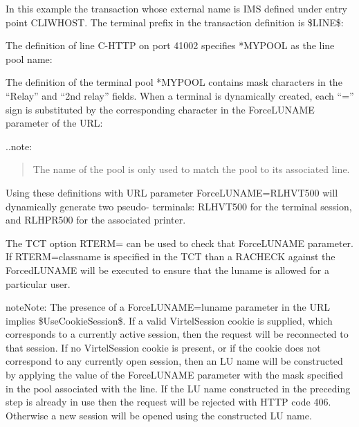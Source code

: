 \documentclass[letterpaper,10pt,english]{sphinxmanual}
\begin{document}
In this example the transaction whose external name is IMS defined under entry point CLIWHOST. The terminal prefix in the transaction definition is \$LINE\$:


The definition of line C-HTTP on port 41002 specifies *MYPOOL as the line pool name:


The definition of the terminal pool *MYPOOL contains mask characters in the “Relay” and “2nd relay” fields. When a terminal is dynamically created, each “=” sign is substituted by the corresponding character in the ForceLUNAME parameter of the URL:


..note:
\begin{quote}

The name of the pool is only used to match the pool to its associated line.
\end{quote}

Using these definitions with URL parameter ForceLUNAME=RLHVT500 will dynamically generate two pseudo- terminals: RLHVT500 for the terminal session, and RLHPR500 for the associated printer.

The TCT option RTERM= can be used to check that ForceLUNAME parameter. If RTERM=classname is specified in the TCT than a RACHECK against the ForcedLUNAME will be executed to ensure that the luname is allowed for a particular user.

\begin{sphinxadmonition}{note}{Note:}
The presence of a ForceLUNAME=luname parameter in the URL implies \$UseCookieSession\$. If a valid VirtelSession cookie is supplied, which corresponds to a currently active session, then the request will be reconnected to that session. If no VirtelSession cookie is present, or if the cookie does not correspond to any currently open session, then an LU name will be constructed by applying the value of the ForceLUNAME parameter with the mask specified in the pool associated with the line. If the LU name constructed in the preceding step is already in use then the request will be rejected with HTTP code 406. Otherwise a new session will be opened using the constructed LU name.
\end{sphinxadmonition}
\end{document}

